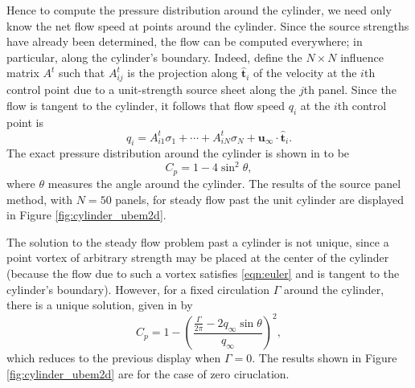 \documentclass[10pt]{article}
\newcommand\figref[1]{Figure \ref{#1}}
\begin{document}
Hence to compute the pressure distribution around the cylinder, we need only know the net flow speed at points around the cylinder.  Since the source strengths have already been determined, the flow can be computed everywhere; in particular, along the cylinder's boundary.  Indeed, define the $N\times N$ influence matrix $A^t$ such that $A_{ij}^t$ is the projection along $\hat{\mathbf t}_i$ of the velocity at the $i$th control point due to a unit-strength source sheet along the $j$th panel.  Since the flow is tangent to the cylinder, it follows that flow speed $q_i$ at the $i$th control point is \[q_i = A_{i1}^t\sigma_1 + \cdots + A_{iN}^t\sigma_N + \mathbf u_\infty\cdot\hat{\mathbf t}_i.\]  The exact pressure distribution around the cylinder is shown in \cite{currie} to be \[C_p=1-4\sin^2\theta,\] where $\theta$ measures the angle around the cylinder.  The results of the source panel method, with $N=50$ panels, for steady flow past the unit cylinder are displayed in \figref{fig:cylinder_ubem2d}.

The solution to the steady flow problem past a cylinder is not unique, since a point vortex of arbitrary strength may be placed at the center of the cylinder (because the flow due to such a vortex satisfies \eqref{eqn:euler} and is tangent to the cylinder's boundary).  However, for a fixed circulation $\Gamma$ around the cylinder, there is a unique solution, given in \cite{currie} by \[C_p = 1-\left(\frac{\frac{\Gamma}{2\pi}-2q_\infty\sin\theta}{q_\infty}\right)^2,\] which reduces to the previous display when $\Gamma=0$.  The results shown in \figref{fig:cylinder_ubem2d} are for the case of zero ciruclation.
\end{document}
